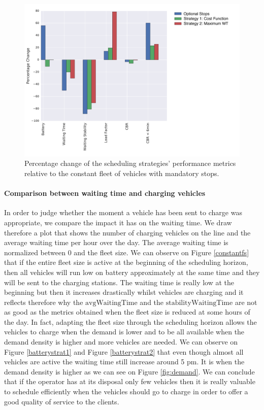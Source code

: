 \documentclass[12pt,a4paper]{article}
\begin{document}
\begin{figure}[h] 
  \centering
\includegraphics[scale=0.55]{./images/strategyCompare.pdf}
  \caption{Percentage change of the scheduling strategies' performance metrics relative to the constant fleet of vehicles with mandatory stops.}
\label{strategyCompare}
\end{figure}

\paragraph{Comparison between waiting time and charging vehicles}
In order to judge whether the moment a vehicle has been sent to charge was appropriate, we compare the impact it has on the waiting time. We draw therefore a plot that shows the number of charging vehicles on the line and the average waiting time per hour over the day. The average waiting time is normalized between 0 and the fleet size. We can observe on Figure \ref{constantfs} that if the entire fleet size is active at the beginning of the scheduling horizon, then all vehicles will run low on battery approximately at the same time and they will be sent to the charging stations. The waiting time is really low at the beginning but then it increases drastically whilst vehicles are charging and it reflects therefore why the $\text{avgWaitingTime}$ and the $\text{stabilityWaitingTime}$ are not as good as the metrics obtained when the fleet size is reduced at some hours of the day. In fact, adapting the fleet size through the scheduling horizon allows the vehicles to charge when the demand is lower and to be all available when the demand density is higher and more vehicles are needed. We can observe on Figure \ref{batterystrat1} and Figure \ref{batterystrat2} that even though almost all vehicles are active the waiting time still increase around 5 pm. It is when the demand density is higher as we can see on Figure \ref{fig:demand}. We can conclude that if the operator has at its disposal only few vehicles then it is really valuable to schedule efficiently when the vehicles should go to charge in order to offer a good quality of service to the clients. 
\end{document}
